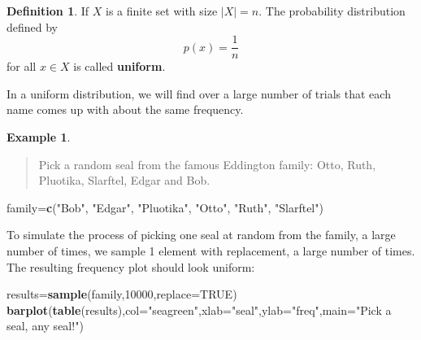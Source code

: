 \documentclass[
]{book}
\newenvironment{Shaded}{\begin{snugshade}}{\end{snugshade}}
\newcommand{\AttributeTok}[1]{\textcolor[rgb]{0.13,0.29,0.53}{#1}}
\newcommand{\ConstantTok}[1]{\textcolor[rgb]{0.56,0.35,0.01}{#1}}
\newcommand{\DecValTok}[1]{\textcolor[rgb]{0.00,0.00,0.81}{#1}}
\newcommand{\FunctionTok}[1]{\textcolor[rgb]{0.13,0.29,0.53}{\textbf{#1}}}
\newcommand{\NormalTok}[1]{#1}
\newcommand{\OtherTok}[1]{\textcolor[rgb]{0.56,0.35,0.01}{#1}}
\newcommand{\StringTok}[1]{\textcolor[rgb]{0.31,0.60,0.02}{#1}}
\theoremstyle{definition}
\newtheorem{definition}{Definition}[chapter]
\theoremstyle{definition}
\newtheorem{example}{Example}[chapter]
\theoremstyle{definition}
\theoremstyle{definition}
\theoremstyle{remark}
\begin{document}
\begin{definition}
\protect\hypertarget{def:discrete-uniform}{}\label{def:discrete-uniform}If \(X\) is a finite set with size \(|X| = n\). The probability distribution defined by \[p(x) = \frac{1}{n}\] for all \(x \in X\) is called \textbf{uniform}.
\end{definition}

In a uniform distribution, we will find over a large number of trials that each name comes up with about the same frequency.

\begin{example}
\protect\hypertarget{exm:seals-uniform-R}{}\label{exm:seals-uniform-R}\leavevmode

\begin{quote}
Pick a random seal from the famous Eddington family: Otto, Ruth, Pluotika, Slarftel, Edgar and Bob.
\end{quote}

\begin{Shaded}
\begin{Highlighting}[]
\NormalTok{family}\OtherTok{=}\FunctionTok{c}\NormalTok{(}\StringTok{"Bob"}\NormalTok{, }\StringTok{"Edgar"}\NormalTok{, }\StringTok{"Pluotika"}\NormalTok{, }\StringTok{"Otto"}\NormalTok{, }\StringTok{"Ruth"}\NormalTok{, }\StringTok{"Slarftel"}\NormalTok{)}
\end{Highlighting}
\end{Shaded}

To simulate the process of picking one seal at random from the family, a large number of times, we sample 1 element with replacement, a large number of times. The resulting frequency plot should look uniform:

\begin{Shaded}
\begin{Highlighting}[]
\NormalTok{results}\OtherTok{=}\FunctionTok{sample}\NormalTok{(family,}\DecValTok{10000}\NormalTok{,}\AttributeTok{replace=}\ConstantTok{TRUE}\NormalTok{)}
\FunctionTok{barplot}\NormalTok{(}\FunctionTok{table}\NormalTok{(results),}\AttributeTok{col=}\StringTok{"seagreen"}\NormalTok{,}\AttributeTok{xlab=}\StringTok{"seal"}\NormalTok{,}\AttributeTok{ylab=}\StringTok{"freq"}\NormalTok{,}\AttributeTok{main=}\StringTok{"Pick a seal, any seal!"}\NormalTok{)}
\end{Highlighting}
\end{Shaded}


\end{example}
\end{document}
